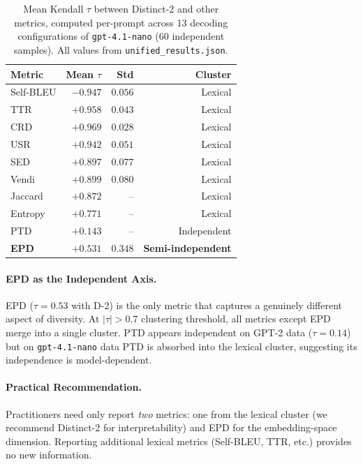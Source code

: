 \documentclass[11pt]{article}
\begin{document}
\begin{table}[t]
\centering
\small
\caption{Mean Kendall $\tau$ between Distinct-2 and other metrics,
computed per-prompt across 13 decoding configurations of
\texttt{gpt-4.1-nano} (60 independent samples).
All values from \texttt{unified\_results.json}.}
\label{tab:taxonomy}
\begin{tabular}{lrrr}
\toprule
Metric & Mean $\tau$ & Std & Cluster \\
\midrule
Self-BLEU   & $-0.947$ & $0.056$ & Lexical \\
TTR         & $+0.958$ & $0.043$ & Lexical \\
CRD         & $+0.969$ & $0.028$ & Lexical \\
USR         & $+0.942$ & $0.051$ & Lexical \\
SED         & $+0.897$ & $0.077$ & Lexical \\
Vendi       & $+0.899$ & $0.080$ & Lexical \\
Jaccard     & $+0.872$ & -- & Lexical \\
Entropy     & $+0.771$ & -- & Lexical \\
PTD         & $+0.143$ & -- & Independent \\
\textbf{EPD} & $+0.531$ & $0.348$ & \textbf{Semi-independent} \\
\bottomrule
\end{tabular}
\end{table}

\paragraph{EPD as the Independent Axis.}
EPD ($\tau = 0.53$ with D-2) is the only metric that captures
a genuinely different aspect of diversity. At $|\tau| > 0.7$
clustering threshold, all metrics except EPD merge into a single
cluster. PTD appears independent on GPT-2 data ($\tau = 0.14$)
but on \texttt{gpt-4.1-nano} data PTD is absorbed into the
lexical cluster, suggesting its independence is model-dependent.

\paragraph{Practical Recommendation.}
Practitioners need only report \emph{two} metrics: one from the
lexical cluster (we recommend Distinct-2 for interpretability)
and EPD for the embedding-space dimension. Reporting additional
lexical metrics (Self-BLEU, TTR, etc.) provides no new information.
\end{document}
